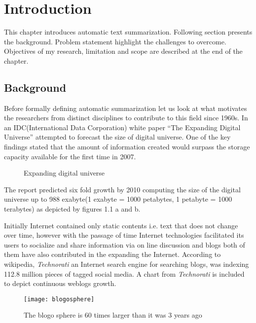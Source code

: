 \chapter{Introduction}
This chapter introduces automatic text summarization. Following section presents the background. Problem statement highlight the challenges to overcome.
Objectives of my research,  limitation and scope are described at the end of the chapter.
\section{Background}
Before formally defining automatic summarization let us look at what motivates the researchers from distinct disciplines to contribute to this field since 1960s.
In an IDC(International Data Corporation) white paper  ``The Expanding Digital Universe'' attempted to forecast the size of digital universe. One of the 
key findings stated that the amount of information created would surpass the storage capacity available for the first time in 2007.

\begin{figure}[!h]
\centering
{}
\caption{Expanding digital universe}
\end{figure}

The report predicted six fold growth by 2010 computing the size of the digital 
universe up to 988 exabyte(1 exabyte = 1000 petabytes, 1 petabyte = 1000 
terabytes) as depicted by figures 1.1 a and b.  

Initially Internet contained only static contents i.e. text that does not 
change over time, however with the passage of time Internet technologies 
facilitated its users
to socialize and share information via on line discussion and blogs both of 
them have also contributed in the expanding the Internet. According to 
wikipedia, 
\emph{Technorati} an Internet search engine for searching blogs, was indexing 
112.8 million pieces of tagged social media.
A chart from \emph{Technorati} is included to depict continuous weblogs growth. 
\begin{figure}[h]
 
\texttt{[image: blogosphere]}
 \caption{\singlespace The blogo sphere is 60 times larger than it was 3 years 
ago}
\end{figure}

